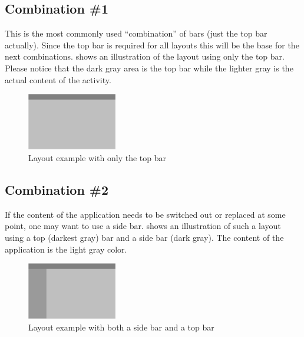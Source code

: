 \subsection{Combination \#1}
This is the most commonly used ``combination'' of bars (just the top bar actually). Since the top bar is required for all layouts this will be the base for the next combinations.  shows an illustration of the layout using only the top bar. Please notice that the dark gray area is the top bar while the lighter gray is the actual content of the activity.

\begin{figure}[!htbp]
    \centering
    \includegraphics[width=0.35\textwidth]{pictures/application_structure/bar_combinations_1}
    \caption{Layout example with only the top bar}
    \label{fig:bar_combinations_1}
\end{figure}

\FloatBarrier

\subsection{Combination \#2}
If the content of the application needs to be switched out or replaced at some point, one may want to use a side bar.  shows an illustration of such a layout using a top (darkest gray) bar and a side bar (dark gray). The content of the application is the light gray color.

\begin{figure}[!htbp]
    \centering
    \includegraphics[width=0.35\textwidth]{pictures/application_structure/bar_combinations_2}
    \caption{Layout example with both a side bar and a top bar}
    \label{fig:bar_combinations_2}
\end{figure}

